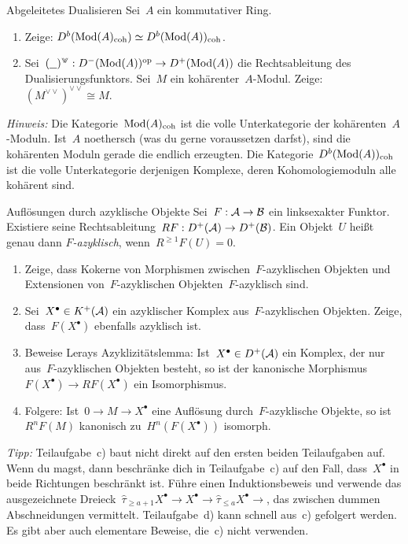 \documentclass{uebblatt}
\newcommand{\dd}{{\vee\!\!\!\vee}}
\begin{document}

\begin{aufgabe}{Abgeleitetes Dualisieren}
Sei~$A$ ein kommutativer Ring.
\begin{enumerate}
\item Zeige: $D^b(\mathrm{Mod}(A)_\mathrm{coh}) \simeq D^b(\mathrm{Mod}(A))_\mathrm{coh}$.
\item Sei~$(\smallplaceholder)^\dd : D^-(\Mod(A))^\op \to D^+(\Mod(A))$ die
Rechtsableitung des Dualisierungsfunktors. Sei~$M$ ein kohärenter~$A$-Modul.
Zeige: $(M^\dd)^\dd \cong M$.
\end{enumerate}

{\tiny\emph{Hinweis:} Die Kategorie~$\mathrm{Mod}(A)_\mathrm{coh}$ ist die volle
Unterkategorie der kohärenten~$A$-Moduln. Ist~$A$ noethersch (was du gerne
voraussetzen darfst), sind die kohärenten Moduln gerade die endlich erzeugten.
Die Kategorie~$D^b(\mathrm{Mod}(A))_\mathrm{coh}$ ist die volle Unterkategorie
derjenigen Komplexe, deren Kohomologiemoduln alle kohärent sind.\par}
\end{aufgabe}

\begin{aufgabe}{Auflösungen durch azyklische Objekte}
Sei~$F : \mathcal{A} \to \mathcal{B}$ ein linksexakter Funktor. Existiere seine
Rechtsableitung~$RF : D^+(\mathcal{A}) \to D^+(\mathcal{B})$. Ein Objekt~$U$ heißt genau dann
\emph{$F$-azyklisch}, wenn~$R^{\geq 1}F(U) = 0$.
\begin{enumerate}
\item Zeige, dass Kokerne von Morphismen zwischen~$F$-azyklischen
Objekten und Extensionen von~$F$-azyklischen Objekten~$F$-azyklisch sind.
\item Sei~$X^\bullet \in K^+(\mathcal{A})$ ein azyklischer Komplex aus~$F$-azyklischen
Objekten. Zeige, dass~$F(X^\bullet)$ ebenfalls azyklisch ist.
\item Beweise Lerays Azyklizitätslemma: Ist~$X^\bullet \in D^+(\mathcal{A})$ ein Komplex, der nur
aus~$F$-azyklischen Objekten besteht, so ist der kanonische
Morphismus~$F(X^\bullet) \to RF(X^\bullet)$ ein Isomorphismus.
\item Folgere: Ist~$0 \to M \to X^\bullet$ eine Auflösung durch~$F$-azyklische
Objekte, so ist~$R^nF(M)$ kanonisch zu~$H^n(F(X^\bullet))$ isomorph.
\end{enumerate}

{\tiny\emph{Tipp:} Teilaufgabe~c) baut nicht direkt auf den ersten beiden
Teilaufgaben auf. Wenn du magst, dann beschränke dich in Teilaufgabe~c) auf den Fall,
dass~$X^\bullet$ in beide Richtungen beschränkt ist. Führe einen
Induktionsbeweis und verwende das ausgezeichnete Dreieck~$\hat\tau_{\geq a+1}
X^\bullet \to X^\bullet \to \hat\tau_{\leq a} X^\bullet \to$, das zwischen
dummen Abschneidungen vermittelt. Teilaufgabe~d) kann schnell aus~c) gefolgert
werden. Es gibt aber auch elementare Beweise, die~c) nicht verwenden.\par}
\end{aufgabe}
\end{document}
